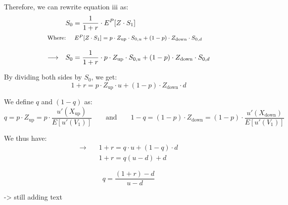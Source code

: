 \documentclass[12pt]{article}
\begin{document}
\vspace{1.5em}

\noindent Therefore, we can rewrite equation iii as:
\begin{align*}
              & S_0 = \frac{1}{1+r} \cdot E^P\!\left[Z \cdot S_1\right] \\[0.5pt]
\intertext{\footnotesize Where: \quad $E^P\!\left[Z \cdot S_1\right] = p \cdot Z_{\text{up}} \cdot S_{0,u} + (1-p) \cdot Z_{\text{down}} \cdot S_{0,d}$}
\\[-8pt]
\longrightarrow \quad & S_0 = \frac{1}{1+r} \cdot p \cdot Z_{\text{up}} \cdot S_{0,u} + (1-p) \cdot Z_{\text{down}} \cdot S_{0,d}
\end{align*}

\vspace{1.5em}

\noindent By dividing both sides by $S_0$, we get:
\[
1 + r = p \cdot Z_{\text{up}} \cdot u + (1-p) \cdot Z_{\text{down}} \cdot d
\]

\vspace{1.5em}

\noindent We define $q$ and $(1-q)$ as:
\[
q = p \cdot Z_{\text{up}}
  = p \cdot \frac{u'(X_{\text{up}})}{E\!\left[u'(V_1)\right]}
\qquad \text{and} \qquad
1-q = (1-p) \cdot Z_{\text{down}}
       = (1-p) \cdot \frac{u'(X_{\text{down}})}{E\!\left[u'(V_1)\right]}
\]
\vspace{1.5em}

We thus have: 
\begin{align*}
\longrightarrow \quad & 1 + r = q \cdot u + (1-q) \cdot d \\[6pt]
                      & 1 + r = q(u - d) + d
\end{align*}

\[
\boxed{ q = \frac{(1+r) - d}{u - d} }
\]

\noindent -> still adding text
\end{document}
